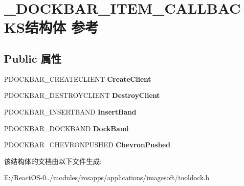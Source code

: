 \hypertarget{struct___d_o_c_k_b_a_r___i_t_e_m___c_a_l_l_b_a_c_k_s}{}\section{\+\_\+\+D\+O\+C\+K\+B\+A\+R\+\_\+\+I\+T\+E\+M\+\_\+\+C\+A\+L\+L\+B\+A\+C\+K\+S结构体 参考}
\label{struct___d_o_c_k_b_a_r___i_t_e_m___c_a_l_l_b_a_c_k_s}
\subsection*{Public 属性}
\begin{DoxyCompactItemize}
\item 
\mbox{\label{struct___d_o_c_k_b_a_r___i_t_e_m___c_a_l_l_b_a_c_k_s_ad024970a898295ec21d274c0aaec755e}} 
P\+D\+O\+C\+K\+B\+A\+R\+\_\+\+C\+R\+E\+A\+T\+E\+C\+L\+I\+E\+NT {\bfseries Create\+Client}
\item 
\mbox{\label{struct___d_o_c_k_b_a_r___i_t_e_m___c_a_l_l_b_a_c_k_s_af465c25e1f09e07b5a340084858db1d3}} 
P\+D\+O\+C\+K\+B\+A\+R\+\_\+\+D\+E\+S\+T\+R\+O\+Y\+C\+L\+I\+E\+NT {\bfseries Destroy\+Client}
\item 
\mbox{\label{struct___d_o_c_k_b_a_r___i_t_e_m___c_a_l_l_b_a_c_k_s_a9cb0ff4bb8aa195d61ea3a846d00b07d}} 
P\+D\+O\+C\+K\+B\+A\+R\+\_\+\+I\+N\+S\+E\+R\+T\+B\+A\+ND {\bfseries Insert\+Band}
\item 
\mbox{\label{struct___d_o_c_k_b_a_r___i_t_e_m___c_a_l_l_b_a_c_k_s_a5e24f7ad0dd036f5d82de220c7e4a22f}} 
P\+D\+O\+C\+K\+B\+A\+R\+\_\+\+D\+O\+C\+K\+B\+A\+ND {\bfseries Dock\+Band}
\item 
\mbox{\label{struct___d_o_c_k_b_a_r___i_t_e_m___c_a_l_l_b_a_c_k_s_afa3e92352991f59c9fc70de3d9027cb3}} 
P\+D\+O\+C\+K\+B\+A\+R\+\_\+\+C\+H\+E\+V\+R\+O\+N\+P\+U\+S\+H\+ED {\bfseries Chevron\+Pushed}
\end{DoxyCompactItemize}


该结构体的文档由以下文件生成\+:\begin{DoxyCompactItemize}
\item 
E\+:/\+React\+O\+S-\/0../modules/rosapps/applications/imagesoft/tooldock.\+h\end{DoxyCompactItemize}
